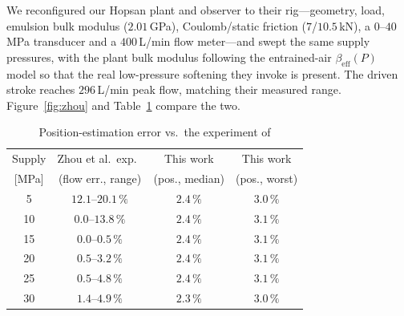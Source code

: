 \documentclass[conference]{IEEEtran}
\begin{document}
We reconfigured our Hopsan plant and observer to their rig---geometry, load,
emulsion bulk modulus ($2.01$\,GPa), Coulomb/static friction ($7$/$10.5$\,kN), a
$0$--$40$\,MPa transducer and a $400$\,L/min flow meter---and swept the same
supply pressures, with the plant bulk modulus following the entrained-air
$\beta_{\text{eff}}(P)$ model so that the real low-pressure softening they invoke
is present. The driven stroke reaches $296$\,L/min peak flow, matching their
measured range. Figure~\ref{fig:zhou} and Table~\ref{tab:zhou} compare the two.

\begin{table}[t]
\caption{Position-estimation error vs.\ the experiment of \cite{zhou2022pressure}}
\label{tab:zhou}
\centering
\footnotesize
\begin{tabular}{cccc}
\hline
Supply & Zhou et al.\ exp.\ & This work & This work \\
{[MPa]} & (flow err., range) & (pos., median) & (pos., worst) \\
\hline
 5 & $12.1$--$20.1\,\%$ & $2.4\,\%$ & $3.0\,\%$ \\
10 & $0.0$--$13.8\,\%$  & $2.4\,\%$ & $3.1\,\%$ \\
15 & $0.0$--$0.5\,\%$   & $2.4\,\%$ & $3.1\,\%$ \\
20 & $0.5$--$3.2\,\%$   & $2.4\,\%$ & $3.1\,\%$ \\
25 & $0.5$--$4.8\,\%$   & $2.4\,\%$ & $3.1\,\%$ \\
30 & $1.4$--$4.9\,\%$   & $2.3\,\%$ & $3.0\,\%$ \\
\hline
\end{tabular}
\end{table}
\end{document}

